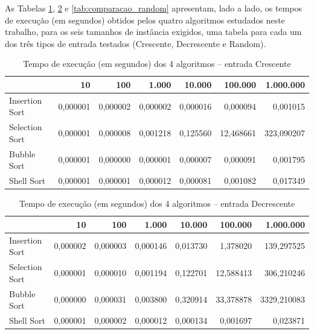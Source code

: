\qquad As Tabelas \ref{tab:comparacao_crescente}, \ref{tab:comparacao_decrescente}
e \ref{tab:comparacao_random} apresentam, lado a lado, os tempos de
execução (em segundos) obtidos pelos quatro algoritmos estudados neste
trabalho, para os seis tamanhos de instância exigidos, uma tabela para
cada um dos três tipos de entrada testados (Crescente, Decrescente e
Random).

\begin{table}[htbp]
    \centering
    \begin{tabular}{|l|r|r|r|r|r|r|}
        \hline
         & 10 & 100 & 1.000 & 10.000 & 100.000 & 1.000.000 \\
        \hline
        Insertion Sort & 0,000001 & 0,000002 & 0,000002 & 0,000016 & 0,000094 & 0,001015 \\
        \hline
        Selection Sort & 0,000001 & 0,000008 & 0,001218 & 0,125560 & 12,468661 & 323,090207 \\
        \hline
        Bubble Sort & 0,000001 & 0,000000 & 0,000001 & 0,000007 & 0,000091 & 0,001795 \\
        \hline
        Shell Sort & 0,000001 & 0,000001 & 0,000012 & 0,000081 & 0,001082 & 0,017349 \\
        \hline
    \end{tabular}
    \caption{Tempo de execução (em segundos) dos 4 algoritmos -- entrada Crescente}
    \label{tab:comparacao_crescente}
\end{table}

\begin{table}[htbp]
    \centering
    \begin{tabular}{|l|r|r|r|r|r|r|}
        \hline
         & 10 & 100 & 1.000 & 10.000 & 100.000 & 1.000.000 \\
        \hline
        Insertion Sort & 0,000002 & 0,000003 & 0,000146 & 0,013730 & 1,378020 & 139,297525 \\
        \hline
        Selection Sort & 0,000001 & 0,000010 & 0,001194 & 0,122701 & 12,588413 & 306,210246 \\
        \hline
        Bubble Sort & 0,000000 & 0,000031 & 0,003800 & 0,320914 & 33,378878 & 3329,210083 \\
        \hline
        Shell Sort & 0,000001 & 0,000002 & 0,000012 & 0,000134 & 0,001697 & 0,023871 \\
        \hline
    \end{tabular}
    \caption{Tempo de execução (em segundos) dos 4 algoritmos -- entrada Decrescente}
    \label{tab:comparacao_decrescente}
\end{table}

